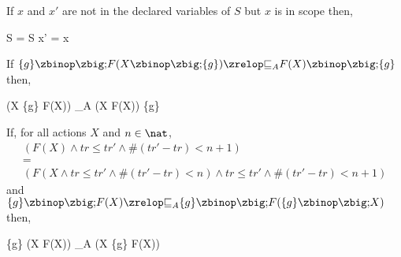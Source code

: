 \ActionIntroLaw*

\ActionRenameLaw*

\begin{law}
  \label{schema-action-fixed-var-intro-law}
  If $x$ and $x'$ are not in the declared variables of $S$ but $x$ is
  in scope then,
  \begin{circus}
    \lschexpract S \rschexpract = \lschexpract S \land x' = x \rschexpract
  \end{circus}
\end{law}

\begin{law}
  \label{rec-assump-distr-law}
  If $\{g\} \circseq F(X \circseq \{g\}) \circrefines_A F(X) \circseq \{g\}$ then,
  \begin{circus}
    (\circmu X \circspot \{g\} \circseq F(X))
    \circrefines_A
    (\circmu X \circspot F(X)) \circseq \{g\}
  \end{circus}
\end{law}

\begin{law}
  \label{assump-rec-distl-law}
  If, for all actions $X$ and $n \in \nat$,
  \[\begin{array}{l}
      (F(X) \land tr \leq tr' \land \# (tr'-tr) < n + 1) \\
      {} = {} \\
      (F(X \land tr \leq tr' \land \# (tr'-tr) < n) \land tr \leq tr' \land \# (tr'-tr) < n + 1)
    \end{array}\]
  and $\{g\} \circseq F(X) \circrefines_A \{g\} \circseq F(\{g\} \circseq X)$ then,
  \begin{circus}
    \{g\} \circseq (\circmu X \circspot F(X))
    \circrefines_A
    (\circmu X \circspot \{g\} \circseq F(X))
  \end{circus}
\end{law}

